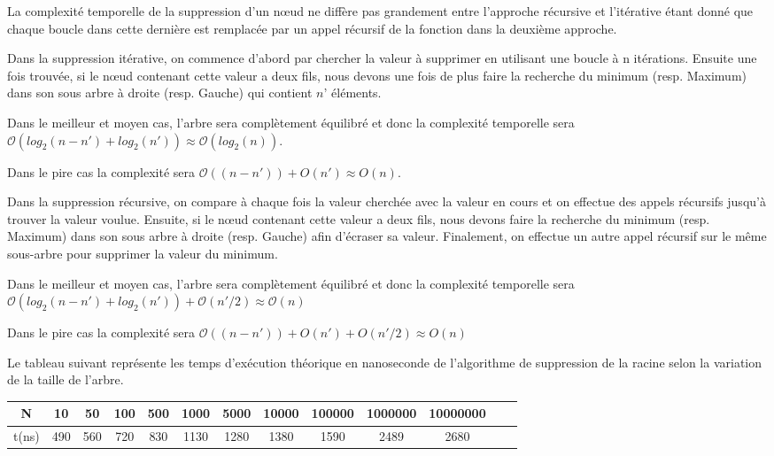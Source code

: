 La complexité temporelle de la suppression d’un nœud ne diffère pas grandement entre l’approche récursive et l’itérative étant donné que chaque boucle dans cette dernière est remplacée par un appel récursif de la fonction dans la deuxième approche.
\par
Dans la suppression itérative, on commence d’abord par chercher la valeur à supprimer en utilisant une boucle à n itérations. Ensuite une fois trouvée, si le nœud contenant cette valeur a deux fils, nous devons une fois de plus faire la recherche du minimum (resp. Maximum) dans son sous arbre à droite (resp. Gauche) qui contient $n’$ éléments.
\par
Dans le meilleur et moyen cas, l’arbre sera complètement équilibré et donc la complexité temporelle sera $\mathcal{O}(log_2(n - n') +log_2(n')) \approx  \mathcal{O}(log_2(n))$.
\par
Dans le pire cas la complexité sera $\mathcal{O}((n -n')) + {O}(n') \approx  {O}(n)$. 
\par
Dans la suppression récursive, on compare à chaque fois la valeur cherchée avec la valeur en cours et on effectue des appels récursifs jusqu’à trouver la valeur voulue. Ensuite, si le nœud contenant cette valeur a deux fils, nous devons faire la recherche du minimum (resp. Maximum) dans son sous arbre à droite (resp. Gauche) afin d’écraser sa valeur. Finalement, on effectue un autre appel récursif sur le même sous-arbre pour supprimer la valeur du minimum.
\par
Dans le meilleur et moyen cas, l’arbre sera complètement équilibré et donc la complexité temporelle sera  $\mathcal{O}(log_2(n - n') +log_2(n')) + \mathcal{O}(n'/2) \approx \mathcal{O}(n)$
\par 
Dans le pire cas la complexité sera $\mathcal{O}((n -n')) + {O}(n') + {O}(n'/2) \approx {O}(n)$

\par
Le tableau suivant représente les temps d'exécution théorique en nanoseconde de l'algorithme de suppression de la racine selon la variation de la taille de l'arbre.

\small
\begin{center}
\begin{tabular}{| c | c | c | c | c | c | c | c | c | c | c | c | c |}
    \hline
    N &  10 & 50 & 100 & 500 & 1000 & 5000 & 10000 & 100000 & 1000000 & 10000000 \\
    \hline
    t(ns) & 490 & 560 & 720 & 830 & 1130 & 1280 & 1380 & 1590 &  2489 & 2680  \\
    
    \hline
\end{tabular}  
\end{center}

